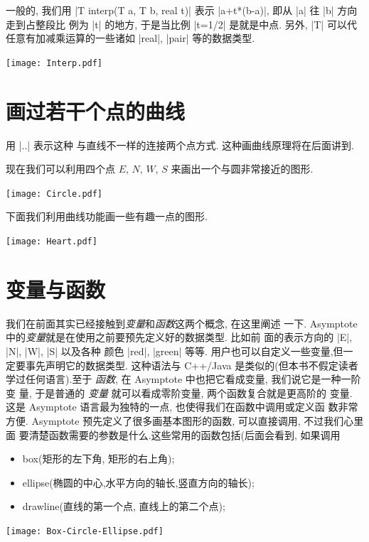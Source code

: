 \documentclass{ctexbook}
\begin{document}
一般的, 我们用 |T interp(T a, T b, real t)| 表示
|a+t*(b-a)|, 即从 |a| 往 |b| 方向走到占整段比
例为 |t| 的地方, 于是当比例 |t=1/2| 是就是中点. 另外,
|T| 可以代任意有加减乘运算的一些诸如 |real|,
|pair| 等的数据类型.
\begin{center}\texttt{[image: Interp.pdf]}\end{center}%


\section{画过若干个点的曲线}
用 |..| 表示这种
与直线不一样的连接两个点方式. 这种画曲线原理将在后面讲到.

现在我们可以利用四个点 $E$, $N$, $W$, $S$ 来画出一个与圆非常接近的图形.
\begin{center}\texttt{[image: Circle.pdf]}\end{center}%


下面我们利用曲线功能画一些有趣一点的图形.
\begin{center}\texttt{[image: Heart.pdf]}\end{center}%


\section{变量与函数}
我们在前面其实已经接触到\emph{变量}和\emph{函数}这两个概念, 在这里阐述
一下. Asymptote 中的\emph{变量}就是在使用之前要预先定义好的数据类型. 比如前
面的表示方向的 |E|, |N|, |W|, |S| 以及各种
颜色 |red|, |green| 等等. 用户也可以自定义一些变量,但一
定要事先声明它的数据类型. 这种语法与 C++/Java 是类似的(但本书不假定读者
学过任何语言).至于 \emph{函数}, 在 Asymptote 中也把它看成变量, 我们说它是一种一阶变
量, 于是普通的 \emph{变量} 就可以看成零阶变量, 两个函数复合就是更高阶的
变量. 这是 Asymptote 语言最为独特的一点, 也使得我们在函数中调用或定义函
数非常方便. Asymptote 预先定义了很多画基本图形的函数, 可以直接调用, 不过我们心里面
要清楚函数需要的参数是什么.这些常用的函数包括(后面会看到, 如果调用
\begin{itemize}
\item {box(矩形的左下角, 矩形的右上角);}
\item {ellipse(椭圆的中心,水平方向的轴长,竖直方向的轴长);}
\item {drawline(直线的第一个点, 直线上的第二个点);}
\end{itemize}

\begin{center}\texttt{[image: Box-Circle-Ellipse.pdf]}\end{center}%

\end{document}
